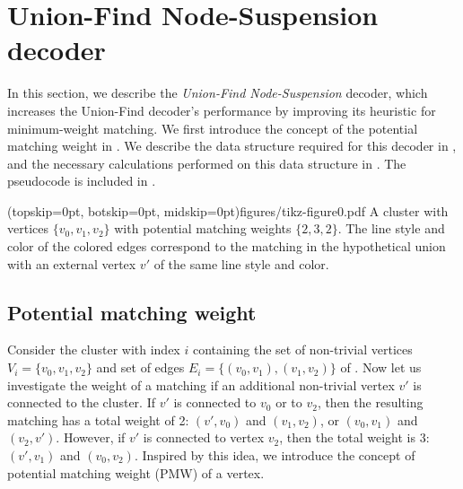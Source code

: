 \section{Union-Find Node-Suspension decoder}\label{sec:ufbb}

In this section, we describe the \emph{Union-Find Node-Suspension} decoder, which increases the Union-Find decoder's performance by improving its heuristic for minimum-weight matching. We first introduce the concept of the potential matching weight in . We describe the data structure required for this decoder in , and the necessary calculations performed on this data structure in . The pseudocode is included in . 

\Figure[htb](topskip=0pt, botskip=0pt, midskip=0pt){figures/tikz-figure0.pdf}{
    A cluster with vertices $\{v_0, v_1, v_2\}$ with potential matching weights $\{2, 3, 2\}$. The line style and color of the colored edges correspond to the matching in the hypothetical union with an external vertex $v'$ of the same line style and color.\label{fig0}}

\subsection{Potential matching weight}\label{sec:matchingweight}

Consider the cluster with index $i$ containing the set of non-trivial vertices $V_i=\{v_0,v_1,v_2\}$ and set of edges $E_i=\{(v_0,v_1), (v_1, v_2)\}$ of . Now let us investigate the weight of a matching if an additional non-trivial vertex $v'$ is connected to the cluster. If $v'$ is connected to $v_0$ or to $v_2$, then the resulting matching has a total weight of 2: $(v',v_0)$ and $(v_1,v_2)$, or $(v_0,v_1)$ and $(v_2,v')$. However, if $v'$ is connected to vertex $v_2$, then the total weight is 3: $(v', v_1)$ and $(v_0, v_2)$. Inspired by this idea, we introduce the concept of potential matching weight (PMW) of a vertex. 


